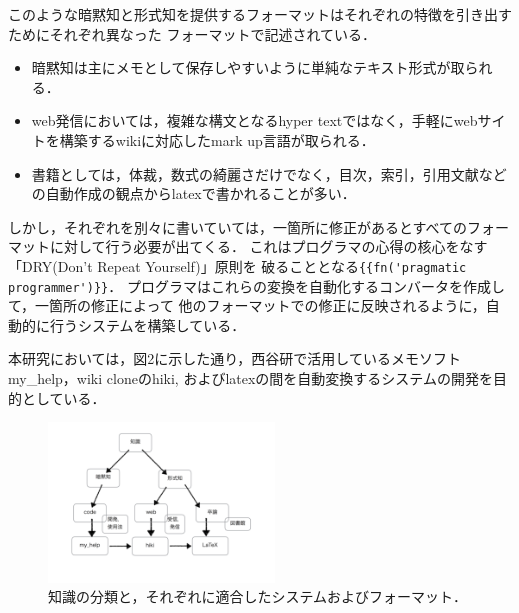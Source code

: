 このような暗黙知と形式知を提供するフォーマットはそれぞれの特徴を引き出すためにそれぞれ異なった
フォーマットで記述されている．

\begin{itemize}
\item 暗黙知は主にメモとして保存しやすいように単純なテキスト形式が取られる．
\item web発信においては，複雑な構文となるhyper textではなく，手軽にwebサイトを構築するwikiに対応したmark up言語が取られる．
\item 書籍としては，体裁，数式の綺麗さだけでなく，目次，索引，引用文献などの自動作成の観点からlatexで書かれることが多い．
\end{itemize}
しかし，それぞれを別々に書いていては，一箇所に修正があるとすべてのフォーマットに対して行う必要が出てくる．
これはプログラマの心得の核心をなす「DRY(Don't Repeat Yourself)」原則を
破ることとなる\verb|{{fn('pragmatic programmer')}}|．
プログラマはこれらの変換を自動化するコンバータを作成して，一箇所の修正によって
他のフォーマットでの修正に反映されるように，自動的に行うシステムを構築している．

本研究においては，図2に示した通り，西谷研で活用しているメモソフト
my\_help，wiki cloneのhiki, およびlatexの間を自動変換するシステムの開発を目的としている．

\begin{figure}[htbp]\begin{center}
\includegraphics[width=6cm,bb=0 0 600  500]{knowledge_controll_cui.png}
\caption{知識の分類と，それぞれに適合したシステムおよびフォーマット．}
\label{default}\end{center}\end{figure}